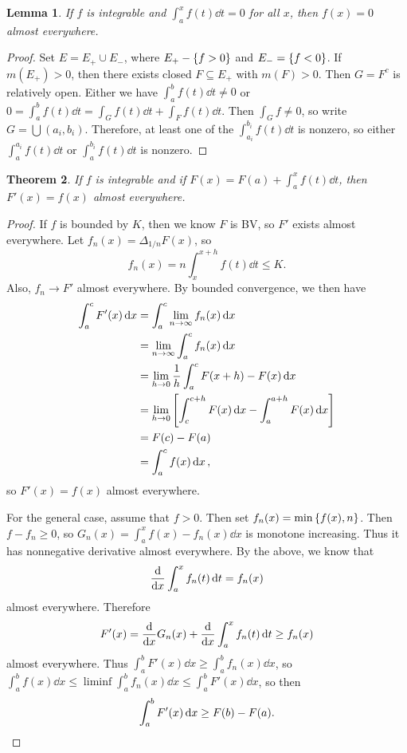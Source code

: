 \documentclass[leqno, openany]{memoir}
\newtheorem{thm}{Theorem}[chapter]
\newtheorem{lem}[thm]{Lemma}
\theoremstyle{definition}
\theoremstyle{remark}
\theoremstyle{plain}
\theoremstyle{definition}
\theoremstyle{remark}
\begin{document}
\begin{lem}
    If $f$ is integrable and $\int_a^x f(t) \dd{t} = 0$ for all $x$, then $f(x) = 0$ almost everywhere.
\end{lem}

\begin{proof}
    Set $E = E_+ \cup E_-$, where $E_+ - \qty{f > 0}$ and $E_- = \qty{f < 0}$. If $m(E_+) > 0$, then there exists closed $F \subseteq E_+$ with $m(F) > 0$. Then $G = F^c$ is relatively open. Either we have $\int_a^b f(t) \dd{t} \neq 0$ or $0 = \int_a^b f(t) \dd{t} = \int_G f(t) \dd{t} + \int_F f(t) \dd{t}$. Then $\int_G f \neq 0$, so write $G = \bigcup (a_i,b_i)$. Therefore, at least one of the $\int_{a_i}^{b_i} f(t) \dd{t}$ is nonzero, so either $\int_a^{a_i} f(t) \dd{t}$ or $\int_a^{b_i} f(t) \dd{t}$ is nonzero.
\end{proof}

\begin{thm}
    If $f$ is integrable and if $F(x) = F(a) + \int_a^x f(t) \dd{t}$, then $F'(x) = f(x)$ almost everywhere.
\end{thm}

\begin{proof}
    If $f$ is bounded by $K$, then we know $F$ is BV, so $F'$ exists almost everywhere. Let $f_n(x) = \Delta_{1/n} F(x)$, so
    \[ f_n(x) = n \int_x^{x+h} f(t) \dd{t} \leq K. \]
    Also, $f_n \to F'$ almost everywhere. By bounded convergence, we then have
    \begin{align*}
        \int_a^c F'(x) \dd{x} &= \int_a^c \lim_{n \to \infty} f_n(x) \dd{x} \\
                              &= \lim_{n \to \infty} \int_a^c f_n(x) \dd{x} \\
                              &= \lim_{h \to 0} \frac{1}{h} \int_a^c F(x+h) - F(x) \dd{x} \\
                              &= \lim_{h \to 0} \qty[\int_c^{c+h} F(x) \dd{x} - \int_a^{a+h} F(x) \dd{x}] \\
                              &= F(c) - F(a) \\
                              &= \int_a^c f(x) \dd{x},
    \end{align*}
    so $F'(x) = f(x)$ almost everywhere.

    For the general case, assume that $f > 0$. Then set $f_n(x) = \min\qty{f(x),n}$. Then $f - f_n \geq 0$, so $G_n(x) = \int_a^x f(x) - f_n(x) \dd{x}$ is monotone increasing. Thus it has nonnegative derivative almost everywhere. By the above, we know that
    \[ \dv{x} \int_a^x f_n(t) \dd{t} = f_n(x) \]
    almost everywhere. Therefore
    \[ F'(x) = \dv{x} G_n(x) + \dv{x} \int_a^x f_n(t) \dd{t} \geq f_n(x) \]
    almost everywhere. Thus $\int_a^b F'(x) \dd{x} \geq \int_a^b f_n(x) \dd{x}$, so $\int_a^b f(x) \dd{x} \leq \liminf \int_a^b f_n(x) \dd{x} \leq \int_{a}^b F'(x) \dd{x}$, so then
    \[ \int_a^b F'(x) \dd{x} \geq F(b) - F(a). \qedhere \]
\end{proof}
\end{document}
